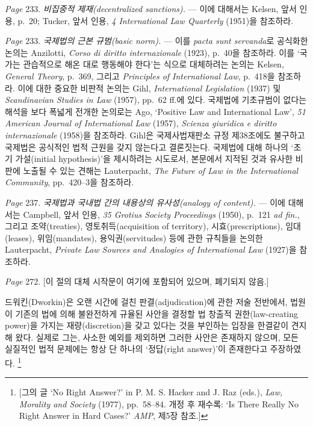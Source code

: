 {\emph{Page} 233. \emph{비집중적 제재(decentralized sanctions).} --- 이에
대해서는 Kelsen, 앞서 인용, p.~20; Tucker, 앞서 인용, \emph{4
International Law Quarterly} (1951)을 참조하라.

\emph{Page} 233. \emph{국제법의 근본 규범(basic norm).} --- 이를
\emph{pacta sunt servanda}로 공식화한 논의는 Anzilotti, \emph{Corso di
diritto internazionale} (1923), p.~40을 참조하라. 이를 `국가는
관습적으로 해온 대로 행동해야 한다'는 식으로 대체하려는 논의는 Kelsen,
\emph{General Theory}, p.~369, 그리고 \emph{Principles of International
Law}, p.~418을 참조하라. 이에 대한 중요한 비판적 논의는 Gihl,
\emph{International Legislation} (1937) 및 \emph{Scandinavian Studies in
Law} (1957), pp.~62 ff.에 있다. 국제법에 기초규범이 없다는 해석을 보다
폭넓게 전개한 논의로는 Ago, `Positive Law and International Law',
\emph{51 American Journal of International Law} (1957), \emph{Scienza
giuridica e diritto internazionale} (1958)을 참조하라. Gihl은
국제사법재판소 규정 제38조에도 불구하고 국제법은 공식적인 법적 근원을
갖지 않는다고 결론짓는다. 국제법에 대해 하나의 `초기 가설(initial
hypothesis)'을 제시하려는 시도로서, 본문에서 지적된 것과 유사한 비판에
노출될 수 있는 견해는 Lauterpacht, \emph{The Future of Law in the
International Community}, pp.~420--3을 참조하라.

\emph{Page} 237. \emph{국제법과 국내법 간의 내용상의 유사성(analogy of
content).} --- 이에 대해서는 Campbell, 앞서 인용, \emph{35 Grotius
Society Proceedings} (1950), p.~121 \emph{ad fin.}, 그리고
조약(treaties), 영토취득(acquisition of territory), 시효(prescriptions),
임대(leases), 위임(mandates), 용익권(servitudes) 등에 관한 규칙들을
논의한 Lauterpacht, \emph{Private Law Sources and Analogies of
International Law} (1927)을 참조하라.

\emph{Page} 272. {[}이 절의 대체 시작문이 여기에 포함되어 있으며,
폐기되지 않음.{]}

드워킨(Dworkin)은 오랜 시간에 걸친 판결(adjudication)에 관한 저술
전반에서, 법원이 기존의 법에 의해 불완전하게 규율된 사안을 결정할 법
창출적 권한(law-creating power)을 가지는 재량(discretion)을 갖고 있다는
것을 부인하는 입장을 한결같이 견지해 왔다. 실제로 그는, 사소한 예외를
제외하면 그러한 사안은 존재하지 않으며, 모든 실질적인 법적 문제에는 항상
단 하나의 `정답(right answer)'이 존재한다고 주장하였다. \footnote{{[}그의
  글 `No Right Answer?' in P. M. S. Hacker and J. Raz (eds.), \emph{Law,
  Morality and Society} (1977), pp.~58--84. 개정 후 재수록: `Is There
  Really No Right Answer in Hard Cases?' \emph{AMP}, 제5장 참조.{]}}

}
